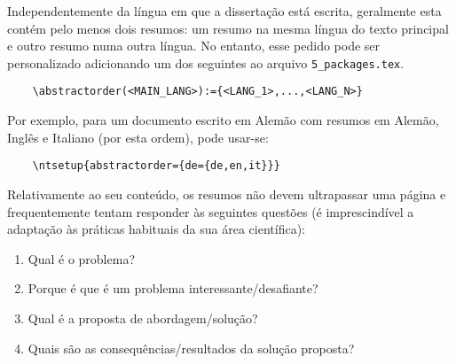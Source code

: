 
%

Independentemente da língua em que a dissertação está escrita, geralmente esta contém pelo menos dois resumos: um resumo na mesma língua do texto principal e outro resumo numa outra língua.
%
No entanto, esse pedido pode ser personalizado adicionando um dos seguintes ao arquivo \verb+5_packages.tex+.

\begin{verbatim}
    \abstractorder(<MAIN_LANG>):={<LANG_1>,...,<LANG_N>}
\end{verbatim}

Por exemplo, para um documento escrito em Alemão com resumos em Alemão, Inglês e Italiano (por esta ordem), pode usar-se:
\begin{verbatim}
    \ntsetup{abstractorder={de={de,en,it}}}
\end{verbatim}

Relativamente ao seu conteúdo, os resumos não devem ultrapassar uma página e frequentemente tentam responder às seguintes questões (é imprescindível a adaptação às práticas habituais da sua área científica):

\begin{enumerate}
  \item Qual é o problema?
  \item Porque é que é um problema interessante/desafiante?
  \item Qual é a proposta de abordagem/solução?
  \item Quais são as consequências/resultados da solução proposta?
\end{enumerate}

%
%

